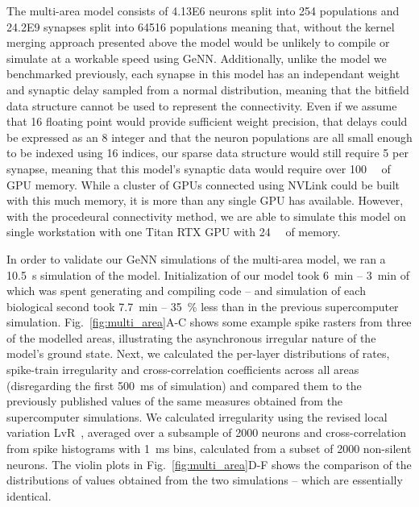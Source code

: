 \documentclass[9pt,twocolumn,twoside,lineno]{pnas-new}
\begin{document}
The multi-area model consists of \num{4.13E6} neurons split into \num{254} populations and \num{24.2E9} synapses split into \num{64516} populations meaning that, without the kernel merging approach presented above the model would be unlikely to compile or simulate at a workable speed using GeNN.
Additionally, unlike the model we benchmarked previously, each synapse in this model has an independant weight and synaptic delay sampled from a normal distribution, meaning that the bitfield data structure cannot be used to represent the connectivity.
Even if we assume that \SI{16}{\bit} floating point would provide sufficient weight precision, that delays could be expressed as an \SI{8}{\bit} integer and that the neuron populations are all small enough to be indexed using \SI{16}{\bit} indices, our sparse data structure would still require \SI{5}{\byte} per synapse, meaning that this model's synaptic data would require over \SI{100}{\giga\byte} of GPU memory.
While a cluster of GPUs connected using NVLink could be built with this much memory, it is more than any single GPU has available.
However, with the procedeural connectivity method, we are able to simulate this model on single workstation with one Titan RTX GPU with \SI{24}{\giga\byte} of memory.

In order to validate our GeNN simulations of the multi-area model, we ran a \SI{10.5}{\second} simulation of the model.
Initialization of our model took \SI{6}{\minute} -- \SI{3}{\minute} of which was spent generating and compiling code -- and simulation of each biological second took \SI{7.7}{\minute} -- \SI{35}{\percent} less than in the previous supercomputer simulation.
Fig.~\ref{fig:multi_area}A-C shows some example spike rasters from three of the modelled areas, illustrating the asynchronous irregular nature of the model's ground state.
Next, we calculated the per-layer distributions of rates, spike-train irregularity and cross-correlation coefficients across all areas (disregarding the first \SI{500}{\milli\second} of simulation) and compared them to the previously published values of the same measures obtained from the supercomputer simulations.
We calculated irregularity using the revised local variation LvR~\citep{Shinomoto2009}, averaged over a subsample of \num{2000} neurons and cross-correlation from spike histograms with \SI{1}{\milli\second} bins, calculated from a subset of \num{2000} non-silent neurons.
The violin plots in Fig.~\ref{fig:multi_area}D-F shows the comparison of the distributions of values obtained from the two simulations -- which are essentially identical.
\end{document}
